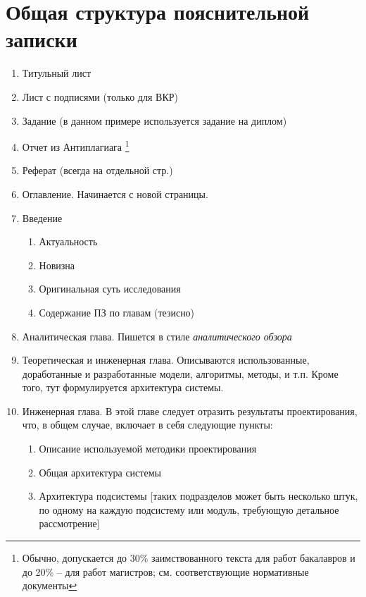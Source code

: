 \chapter{Общая структура пояснительной записки}\label{app-structure}


\begin{enumerate}
	\item Титульный лист %
	\item Лист с подписями (только для ВКР)
	\item Задание (в данном примере используется задание на диплом)
	\item Отчет из Антиплагиага \footnote{Обычно, допускается до 30\% заимствованного текста для работ бакалавров и до 20\% -- для работ магистров; см. соответствующие нормативные документы}
	\item Реферат (всегда на отдельной стр.)%
	\item Оглавление. Начинается с новой страницы. %
	\item Введение
	\begin{enumerate}
		\item Актуальность
		\item Новизна
		\item Оригинальная суть исследования
		\item Содержание ПЗ по главам (тезисно)
	\end{enumerate}
	\item Аналитическая глава. Пишется в стиле \textit{аналитического обзора}
	\item Теоретическая и инженерная глава. Описываются использованные, доработанные и разработанные модели, алгоритмы, методы, и т.п. Кроме того, тут формулируется архитектура системы.
	\item Инженерная глава. В этой главе следует отразить результаты проектирования, что, в общем случае, включает в себя следующие пункты:
	\begin{enumerate}
		\item Описание используемой методики проектирования
		\item Общая архитектура системы
		\item Архитектура подсистемы [таких подразделов может быть несколько штук, по одному на каждую подсистему или модуль, требующую детальное рассмотрение]

\end{enumerate}
\end{enumerate}

